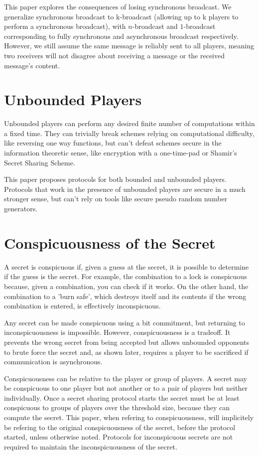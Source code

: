 \documentclass{dalcsthesis}
\begin{document}
This paper explores the consequences of losing synchronous broadcast. We generalize synchronous broadcast to k-broadcast (allowing up to k players to perform a synchronous broadcast), with $n$-broadcast and $1$-broadcast corresponding to fully synchronous and asynchronous broadcast respectively. However, we still assume the same message is reliably sent to all players, meaning two receivers will not disagree about receiving a message or the received message's content.

\section{Unbounded Players}

Unbounded players can perform any desired finite number of computations within a fixed time. They can trivially break schemes relying on computational difficulty, like reversing one way functions, but can't defeat schemes secure in the information theoretic sense, like encryption with a one-time-pad or Shamir's Secret Sharing Scheme.

This paper proposes protocols for both bounded and unbounded players. Protocols that work in the presence of unbounded players are secure in a much stronger sense, but can't rely on tools like secure pseudo random number generators.

\section{Conspicuousness of the Secret} 

A secret is conspicuous if, given a guess at the secret, it is possible to determine if the guess is the secret. For example, the combination to a lock is conspicuous because, given a combination, you can check if it works. On the other hand, the combination to a 'burn safe', which destroys itself and its contents if the wrong combination is entered, is effectively inconspicuous.

Any secret can be made conspicuous using a bit commitment, but returning to inconspicuousness is impossible. However, conspicuousness is a tradeoff. It prevents the wrong secret from being accepted but allows unbounded opponents to brute force the secret and, as shown later, requires a player to be sacrificed if communication is asynchronous.

Conspicuousness can be relative to the player or group of players. A secret may be conspicuous to one player but not another or to a pair of players but neither individually. Once a secret sharing protocol starts the secret must be at least conspicuous to groups of players over the threshold size, because they can compute the secret. This paper, when refering to conspicuousness, will implicitely be refering to the original conspicuousness of the secret, before the protocol started, unless otherwise noted. Protocols for inconspicuous secrets are not required to maintain the inconspicuousness of the secret.
\end{document}
